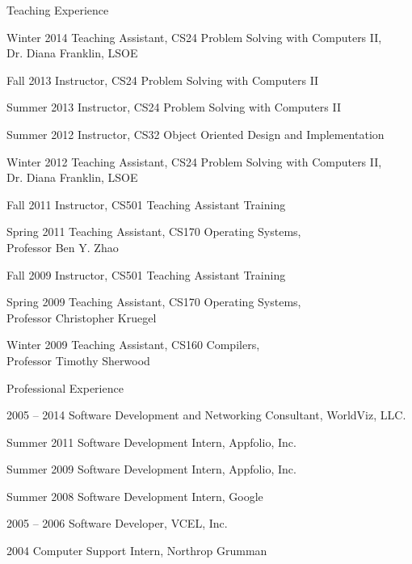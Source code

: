 \begin{vitae}
{\begin{vitaesection}{Teaching Experience}
\vspace{-0.1cm}
  \item [Winter 2014] Teaching Assistant, CS24 Problem Solving with Computers
    II,\\ Dr. Diana Franklin, LSOE
  \item [Fall 2013] Instructor, CS24 Problem Solving with Computers II
  \item [Summer 2013] Instructor, CS24 Problem Solving with Computers II
  \item [Summer 2012] Instructor, CS32 Object Oriented Design and
    Implementation
  \item [Winter 2012] Teaching Assistant, CS24 Problem Solving with Computers
    II,\\ Dr. Diana Franklin, LSOE
  \item [Fall 2011] Instructor, CS501 Teaching Assistant Training
  \item [Spring 2011] Teaching Assistant, CS170 Operating Systems,\\ Professor
    Ben Y. Zhao
  \item [Fall 2009] Instructor, CS501 Teaching Assistant Training
  \item [Spring 2009] Teaching Assistant, CS170 Operating Systems,\\ Professor
    Christopher Kruegel
  \item [Winter 2009] Teaching Assistant, CS160 Compilers,\\ Professor Timothy
    Sherwood
\end{vitaesection}

\begin{vitaesection}{Professional Experience}
\vspace{-0.1cm}
  \item [2005 -- 2014] Software Development and Networking Consultant,
    WorldViz, LLC.
  \item [Summer 2011] Software Development Intern, Appfolio, Inc.
  \item [Summer 2009] Software Development Intern, Appfolio, Inc.
  \item [Summer 2008] Software Development Intern, Google
  \item [2005 -- 2006] Software Developer, VCEL, Inc.
  \item [2004] Computer Support Intern, Northrop Grumman
\end{vitaesection}

}
\end{vitae}
